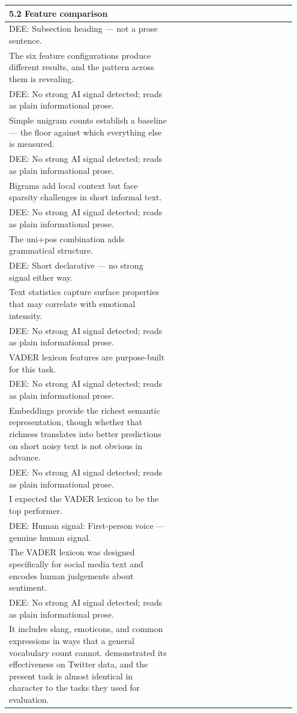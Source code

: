 \documentclass[11pt]{article}
\begin{document}
\begin{longtable}{|p{0.55\linewidth}|p{0.40\linewidth}|}
\hline
5.2 Feature comparison & \\[2pt]
\hline
DEE: Subsection heading --- not a prose sentence. & \\
\hline
The six feature configurations produce different results, and the pattern across them is revealing. & \\[2pt]
\hline
DEE: No strong AI signal detected; reads as plain informational prose. & \\
\hline
Simple unigram counts establish a baseline --- the floor against which everything else is measured. & \\[2pt]
\hline
DEE: No strong AI signal detected; reads as plain informational prose. & \\
\hline
Bigrams add local context but face sparsity challenges in short informal text. & \\[2pt]
\hline
DEE: No strong AI signal detected; reads as plain informational prose. & \\
\hline
The uni+pos combination adds grammatical structure. & \\[2pt]
\hline
DEE: Short declarative --- no strong signal either way. & \\
\hline
Text statistics capture surface properties that may correlate with emotional intensity. & \\[2pt]
\hline
DEE: No strong AI signal detected; reads as plain informational prose. & \\
\hline
VADER lexicon features are purpose-built for this task. & \\[2pt]
\hline
DEE: No strong AI signal detected; reads as plain informational prose. & \\
\hline
Embeddings provide the richest semantic representation, though whether that richness translates into better predictions on short noisy text is not obvious in advance. & \\[2pt]
\hline
DEE: No strong AI signal detected; reads as plain informational prose. & \\
\hline
I expected the VADER lexicon to be the top performer. & \\[2pt]
\hline
DEE: Human signal: First-person voice --- genuine human signal. & \\
\hline
The VADER lexicon was designed specifically for social media text and encodes human judgements about sentiment. & \\[2pt]
\hline
DEE: No strong AI signal detected; reads as plain informational prose. & \\
\hline
It includes slang, emoticons, and common expressions in ways that a general vocabulary count cannot. demonstrated its effectiveness on Twitter data, and the present task is almost identical in character to the tasks they used for evaluation. & \\[2pt]

\end{longtable}
\end{document}
